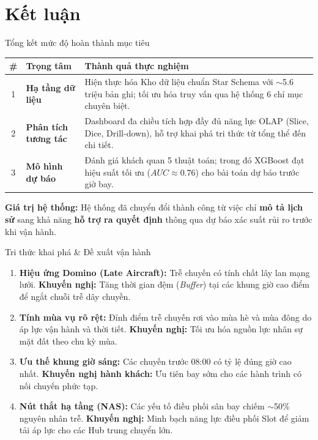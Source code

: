 \section{Kết luận}

\begin{frame}{Tổng kết mức độ hoàn thành mục tiêu}
  \renewcommand{\arraystretch}{1.2}
  \begin{table}
    \centering
    \begin{tabular}{|c|l|p{7.5cm}|}
      \hline
      \textbf{\#} & \textbf{Trọng tâm} & \textbf{Thành quả thực nghiệm} \\
      \hline
      1 & \textbf{Hạ tầng dữ liệu} & Hiện thực hóa Kho dữ liệu chuẩn Star Schema với $\sim$5.6 triệu bản ghi; tối ưu hóa truy vấn qua hệ thống 6 chỉ mục chuyên biệt. \\
      \hline
      2 & \textbf{Phân tích tương tác} & Dashboard đa chiều tích hợp đầy đủ năng lực OLAP (Slice, Dice, Drill-down), hỗ trợ khai phá tri thức từ tổng thể đến chi tiết. \\
      \hline
      3 & \textbf{Mô hình dự báo} & Đánh giá khách quan 5 thuật toán; trong đó XGBoost đạt hiệu suất tối ưu ($AUC \approx 0.76$) cho bài toán dự báo trước giờ bay. \\
      \hline
    \end{tabular}
  \end{table}

  \textbf{Giá trị hệ thống:} Hệ thống đã chuyển đổi thành công từ việc chỉ \textbf{mô tả lịch sử} sang khả năng \textbf{hỗ trợ ra quyết định} thông qua dự báo xác suất rủi ro trước khi vận hành.
\end{frame}

\begin{frame}{Tri thức khai phá \& Đề xuất vận hành}
  \begin{enumerate}
    \item \textbf{Hiệu ứng Domino (Late Aircraft):} Trễ chuyến có tính chất lây lan mạng lưới. \textbf{Khuyến nghị:} Tăng thời gian đệm (\textit{Buffer}) tại các khung giờ cao điểm để ngắt chuỗi trễ dây chuyền.
    \item \textbf{Tính mùa vụ rõ rệt:} Đỉnh điểm trễ chuyến rơi vào mùa hè và mùa đông do áp lực vận hành và thời tiết. \textbf{Khuyến nghị:} Tối ưu hóa nguồn lực nhân sự mặt đất theo chu kỳ mùa.
    \item \textbf{Ưu thế khung giờ sáng:} Các chuyến trước 08:00 có tỷ lệ đúng giờ cao nhất. \textbf{Khuyến nghị hành khách:} Ưu tiên bay sớm cho các hành trình có nối chuyến phức tạp.
    \item \textbf{Nút thắt hạ tầng (NAS):} Các yếu tố điều phối sân bay chiếm $\sim$50\% nguyên nhân trễ. \textbf{Khuyến nghị:} Minh bạch năng lực điều phối Slot để giảm tải áp lực cho các Hub trung chuyển lớn.
  \end{enumerate}
\end{frame}

